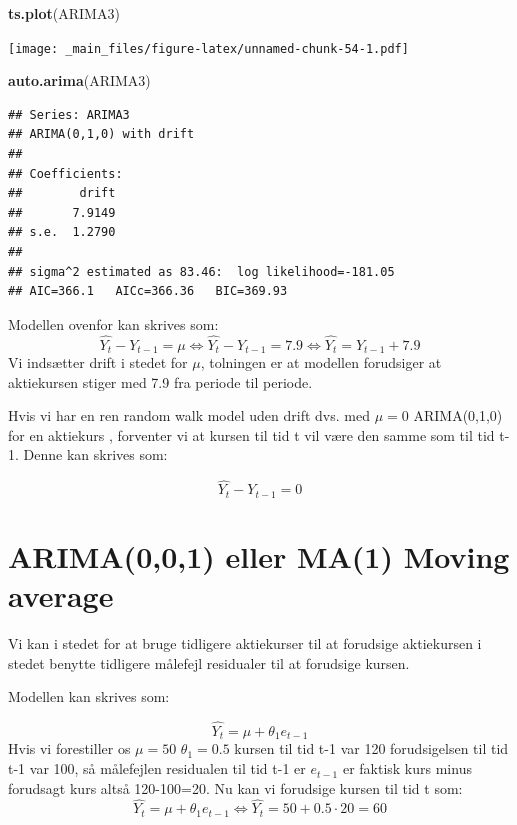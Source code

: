 \documentclass[]{book}
\newenvironment{Shaded}{\begin{snugshade}}{\end{snugshade}}
\newcommand{\KeywordTok}[1]{\textcolor[rgb]{0.13,0.29,0.53}{\textbf{#1}}}
\newcommand{\NormalTok}[1]{#1}
\begin{document}
\begin{Shaded}
\begin{Highlighting}[]
\KeywordTok{ts.plot}\NormalTok{(ARIMA3)}
\end{Highlighting}
\end{Shaded}

\texttt{[image: \_main\_files/figure-latex/unnamed-chunk-54-1.pdf]}

\begin{Shaded}
\begin{Highlighting}[]
\KeywordTok{auto.arima}\NormalTok{(ARIMA3)}
\end{Highlighting}
\end{Shaded}

\begin{verbatim}
## Series: ARIMA3 
## ARIMA(0,1,0) with drift 
## 
## Coefficients:
##        drift
##       7.9149
## s.e.  1.2790
## 
## sigma^2 estimated as 83.46:  log likelihood=-181.05
## AIC=366.1   AICc=366.36   BIC=369.93
\end{verbatim}

Modellen ovenfor kan skrives som:
\[\hat{Y_t}-Y_{t-1}=\mu\Leftrightarrow \hat{Y_t}-Y_{t-1}=7.9\Leftrightarrow \hat{Y_t}=Y_{t-1}+7.9\]
Vi indsætter drift i stedet for \(\mu\), tolningen er at modellen forudsiger at aktiekursen stiger med 7.9 fra periode til periode.

Hvis vi har en ren random walk model uden drift dvs. med \(\mu=0\) ARIMA(0,1,0) for en aktiekurs , forventer vi at kursen til tid t vil være den samme som til tid t-1. Denne kan skrives som:

\[\hat{Y_t}-Y_{t-1}=0\]

\hypertarget{arima001-eller-ma1-moving-average}{%
\section{ARIMA(0,0,1) eller MA(1) Moving average}\label{arima001-eller-ma1-moving-average}}

Vi kan i stedet for at bruge tidligere aktiekurser til at forudsige aktiekursen i stedet benytte tidligere målefejl residualer til at forudsige kursen.

Modellen kan skrives som:

\[\hat{Y_t}=\mu+\theta_1 e_{t-1}\]
Hvis vi forestiller os \(\mu=50\) \(\theta_1=0.5\) kursen til tid t-1 var 120 forudsigelsen til tid t-1 var 100, så målefejlen residualen til tid t-1 er \(e_{t-1}\) er faktisk kurs minus forudsagt kurs altså 120-100=20. Nu kan vi forudsige kursen til tid t som:
\[\hat{Y_t}=\mu+\theta_1 e_{t-1}\Leftrightarrow \hat{Y_t}=50+0.5\cdot20=60\]
\end{document}
